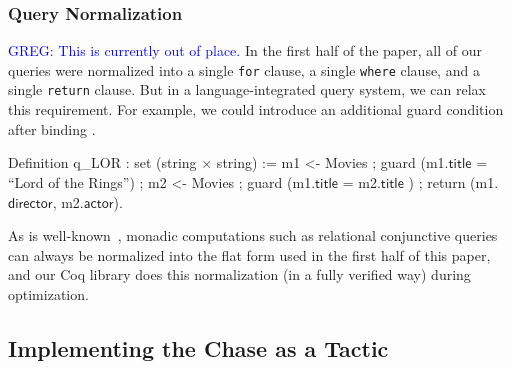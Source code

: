 \documentclass[preprint]{sigplanconf}
\newcommand{\greg}[1]{\textcolor{blue}{GREG: #1}}
\begin{document}
\begin{comment}

The final result of normalization for the movies query is exactly the query presented in Section~\ref{sec:example}.
In our syntax:
\begin{coq}
query (Mprod Movies Movies)
      (fun x => (fst x).(title) = (snd x).(title))
      (fun x => ((fst x).(director), (snd x).(actor)))
\end{coq}
\end{comment}

\subsubsection{Query Normalization}
\greg{This is currently out of place.}
In the first half of the paper, all of our queries were normalized into a single {\tt for} clause, a single {\tt where} clause, and a single {\tt return} clause.  But in a language-integrated query system, we can relax this requirement.  For example, we could introduce an additional guard condition after binding .
\begin{coq}
Definition q_LOR : set (string $\times$ string) :=
  m1 <- Movies ;
  guard (m1.$\textsf{title}$ = ``Lord of the Rings'') ;
  m2 <- Movies ;
  guard (m1.$\textsf{title}$  = m2.$\textsf{title}$ ) ;
  return (m1.$\textsf{director}$, m2.$\textsf{actor}$).
\end{coq}
As is well-known~\cite{monad}, monadic computations such as relational conjunctive queries can always be normalized into the flat form used in the first half of this paper, and our Coq library does this normalization (in a fully verified way) during optimization.


\subsection{Implementing the Chase as a Tactic}
\label{sec:ltac-chase}
\end{document}
